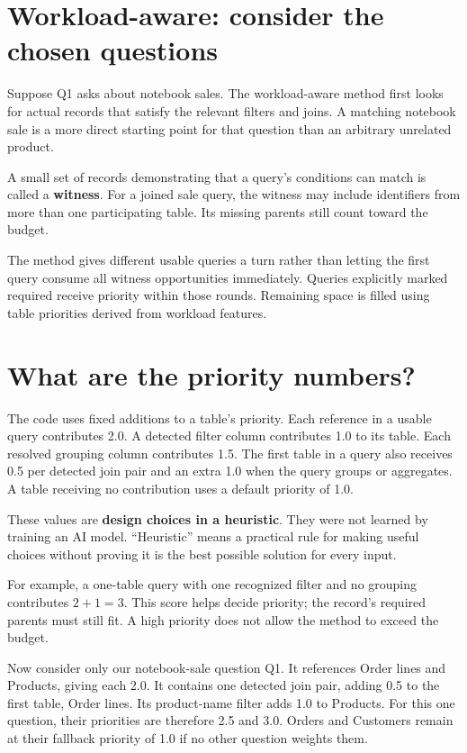 \documentclass[12pt,a4paper,oneside]{report}
\begin{document}
\section{Workload-aware: consider the chosen questions}
Suppose Q1 asks about notebook sales. The workload-aware method first looks for actual records that satisfy the relevant filters and joins. A matching notebook sale is a more direct starting point for that question than an arbitrary unrelated product.

A small set of records demonstrating that a query's conditions can match is called a \textbf{witness}. For a joined sale query, the witness may include identifiers from more than one participating table. Its missing parents still count toward the budget.

The method gives different usable queries a turn rather than letting the first query consume all witness opportunities immediately. Queries explicitly marked required receive priority within those rounds. Remaining space is filled using table priorities derived from workload features.

\section{What are the priority numbers?}
The code uses fixed additions to a table's priority. Each reference in a usable query contributes 2.0. A detected filter column contributes 1.0 to its table. Each resolved grouping column contributes 1.5. The first table in a query also receives 0.5 per detected join pair and an extra 1.0 when the query groups or aggregates. A table receiving no contribution uses a default priority of 1.0.

These values are \textbf{design choices in a heuristic}. They were not learned by training an AI model. ``Heuristic'' means a practical rule for making useful choices without proving it is the best possible solution for every input.

For example, a one-table query with one recognized filter and no grouping contributes $2+1=3$. This score helps decide priority; the record's required parents must still fit. A high priority does not allow the method to exceed the budget.

Now consider only our notebook-sale question Q1. It references Order lines and Products, giving each 2.0. It contains one detected join pair, adding 0.5 to the first table, Order lines. Its product-name filter adds 1.0 to Products. For this one question, their priorities are therefore 2.5 and 3.0. Orders and Customers remain at their fallback priority of 1.0 if no other question weights them.
\end{document}
